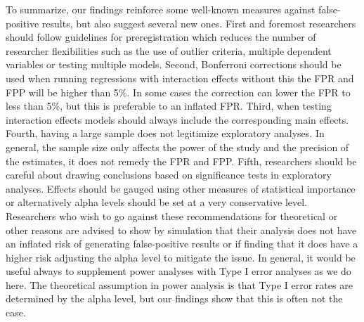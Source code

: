 To summarize, our findings reinforce some well-known measures against false-positive results, but also suggest several new ones. First and foremost researchers should follow guidelines for preregistration \citep{Nosek2015,VANTVEER20162} which reduces the number of researcher flexibilities such as the use of outlier criteria, multiple dependent variables or testing multiple models. Second, Bonferroni corrections should be used when running regressions with interaction effects without this the FPR and FPP will be higher than 5\%. In some cases the correction can lower the FPR to less than 5\%, but this is preferable to an inflated FPR. Third, when testing interaction effects models should always include the corresponding main effects. Fourth, having a large sample does not legitimize exploratory analyses. In general, the sample size only affects the power of the study and the precision of the estimates, it does not remedy the FPR and FPP. Fifth, researchers should be careful about drawing conclusions based on significance tests in exploratory analyses. Effects should be gauged using other measures of statistical importance or alternatively alpha levels should be set at a very conservative level. \\
Researchers who wish to go against these recommendations for theoretical or other reasons are advised to show by simulation that their analysis does not have an inflated risk of generating false-positive results or if finding that it does have a higher risk adjusting the alpha level to mitigate the issue. In general, it would be useful always to supplement power analyses with Type I error analyses as we do here. The theoretical assumption in power analysis is that Type I error rates are determined by the alpha level, but our findings show that this is often not the case.




 
